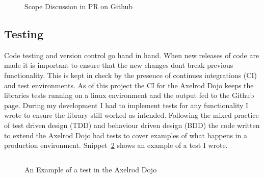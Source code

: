 \begin{figure}[ht]
\begin{minipage}{0.48\textwidth}
    \caption{Scope Discussion in PR on Github}\label{fig:PR-scope-discussion}
    \end{minipage}
\end{figure}

\subsection{Testing}\label{ssec:testing}
Code testing and version control go hand in hand. 
When new releases of code are made it is important to ensure that the new changes dont break previous functionality.
This is kept in check by the presence of continues integrations (CI) and test environments.
As of this project the CI for the Axelrod Dojo keeps the libraries tests running on a linux environment and the output fed to the Github page.
During my development I had to implement tests for any functionality I wrote to ensure the library still worked as intended.
Following the mixed practice of test driven design (TDD) and behaviour driven design (BDD) the code written to extend the Axelrod Dojo had tests to cover examples of what happens in a production environment.
Snippet~\ref{code:test-example} shows an example of a test I wrote.

\begin{figure}[ht]
    \inputminted{python}{code_snippets/dev-examples/example-test.py}
    \caption{An Example of a test in the Axelrod Dojo}\label{code:test-example}
\end{figure}
